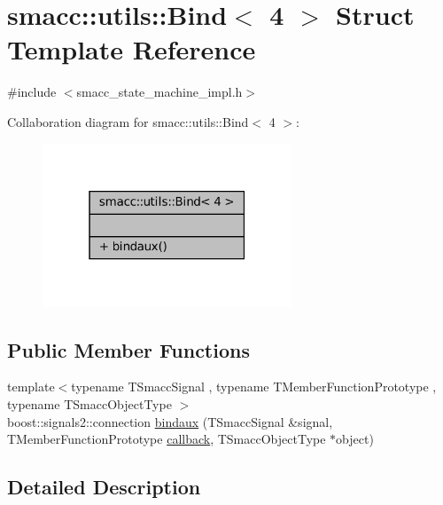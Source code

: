 \hypertarget{structsmacc_1_1utils_1_1Bind_3_014_01_4}{}\section{smacc\+:\+:utils\+:\+:Bind$<$ 4 $>$ Struct Template Reference}
\label{structsmacc_1_1utils_1_1Bind_3_014_01_4}


{\ttfamily \#include $<$smacc\+\_\+state\+\_\+machine\+\_\+impl.\+h$>$}



Collaboration diagram for smacc\+:\+:utils\+:\+:Bind$<$ 4 $>$\+:
\nopagebreak
\begin{figure}[H]
\begin{center}
\leavevmode
\includegraphics[width=211pt]{structsmacc_1_1utils_1_1Bind_3_014_01_4__coll__graph}
\end{center}
\end{figure}
\subsection*{Public Member Functions}
\begin{DoxyCompactItemize}
\item 
{\footnotesize template$<$typename T\+Smacc\+Signal , typename T\+Member\+Function\+Prototype , typename T\+Smacc\+Object\+Type $>$ }\\boost\+::signals2\+::connection \hyperlink{structsmacc_1_1utils_1_1Bind_3_014_01_4_af999b2ea156fad369be761be47f83f18}{bindaux} (T\+Smacc\+Signal \&signal, T\+Member\+Function\+Prototype \hyperlink{sm__ridgeback__barrel__search__2_2servers_2opencv__perception__node_2opencv__perception__node_8cpp_a050e697bd654facce10ea3f6549669b3}{callback}, T\+Smacc\+Object\+Type $\ast$object)
\end{DoxyCompactItemize}


\subsection{Detailed Description}
